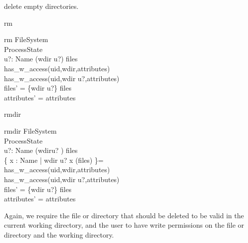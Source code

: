 delete empty directories.  
\begin{doc}{rm}
  \begin{schema}{rm}
    \Delta FileSystem \\
    \Xi ProcessState \\
    u?: Name
    \where
    (wdir \cat \langle u?\rangle) \isfilein files\\ 
    has\_w\_access(uid,wdir,attributes) \\
    has\_w\_access(uid,wdir \cat \langle u?\rangle,attributes)\\
    files' = \{wdir \cat \langle u?\rangle\} \ndres files\\
    attributes' = attributes \\ 
  \end{schema}
\end{doc}
\begin{doc}{rmdir}
  \begin{schema}{rmdir}
    \Delta FileSystem \\
    \Xi ProcessState \\
    u?: Name
    \where
    (wdir\cat\langle u? \rangle) \isin files \\
    \{ x : Name | wdir \cat \langle u? \rangle \cat \langle x \rangle \isdirin
    (files) \}= \emptyset \\
    has\_w\_access(uid,wdir,attributes) \\
    has\_w\_access(uid,wdir \cat \langle u?\rangle,attributes) \\
    files' = \{wdir \cat \langle u?\rangle\} \ndres files \\
    attributes' = attributes \\ 
  \end{schema}
\end{doc}
Again, we require the file or directory that should
be deleted to be valid in the current working directory, and the user to have
write permissions on the file or directory and the working directory.

